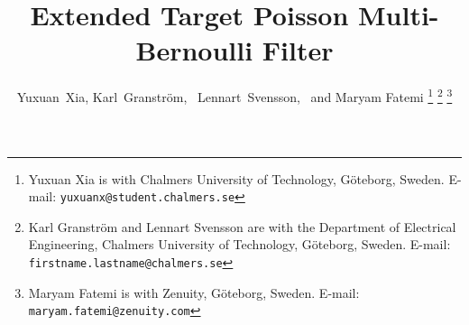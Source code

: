 \documentclass[journal]{IEEEtran}
\begin{document}
\title{Extended Target Poisson Multi-Bernoulli Filter\\
}


\author{Yuxuan~Xia, Karl~Granstr\"{o}m,~ Lennart~Svensson,~ and Maryam Fatemi%
\thanks{Yuxuan Xia is with Chalmers University of Technology, G\"{o}teborg, Sweden. E-mail: \texttt{yuxuanx@student.chalmers.se}}%
\thanks{Karl Granstr\"{o}m and Lennart Svensson are with the Department of Electrical Engineering, Chalmers University of Technology, G\"{o}teborg, Sweden.
E-mail: \texttt{firstname.lastname@chalmers.se}}%
\thanks{Maryam Fatemi is with Zenuity, G\"{o}teborg, Sweden. E-mail: \texttt{maryam.fatemi@zenuity.com}}}

\maketitle
\end{document}

